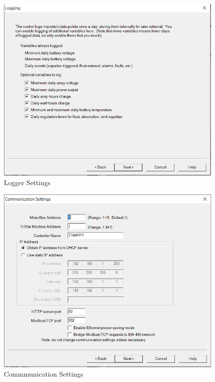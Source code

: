 \begin{figure}[!htb]
	\includegraphics[width=\textwidth,height=\textwidth]{./graphics/tsmppt_troubleshooting/ms_11.png}
	\caption{\label{fig:settings-6} Logger Settings}
\end{figure}
\begin{figure}[!htb]
	\includegraphics[width=\textwidth,height=\textwidth]{./graphics/tsmppt_troubleshooting/ms_12.png}
	\caption{\label{fig:settings-7} Commmunication Settings}
\end{figure}
